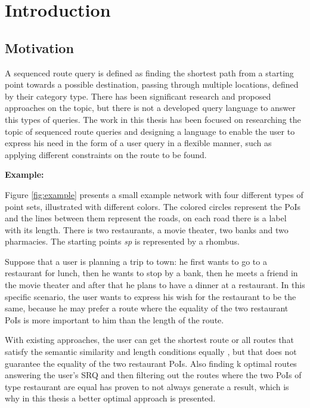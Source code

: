 \chapter{Introduction}
\label{sec:intro}

\section{Motivation}
\label{sec:motivation}
A sequenced route query is defined as finding the shortest path from a starting point towards a possible destination, passing through multiple locations, defined by their category type. There has been significant research and proposed approaches on the topic, but there is not a developed query language to answer this types of queries. The work in this thesis has been focused on researching the topic of sequenced route queries and designing a language to enable the user to express his need in the form of a user query in a flexible manner, such as applying different constraints on the route to be found.

\textbf{Example:}

Figure \ref{fig:example} presents a small example network with four different types of point sets, illustrated with different colors. The colored circles represent the PoIs and the lines between them represent the roads, on each road there is a label with its length. There is two restaurants, a movie theater, two banks and two pharmacies. The starting points \textit{sp} is represented by a rhombus.

Suppose that a user is planning a trip to town: he first wants to go to a restaurant for lunch, then he wants to stop by a bank, then he meets a friend in the movie theater and after that he plans to have a dinner at a restaurant. In this specific scenario, the user wants to express his wish for the restaurant to be the same, because he may prefer a route where the equality of the two restaurant PoIs is more important to him than the length of the route.

With existing approaches, the user can get the shortest route \cite{OSR} or all routes that satisfy the semantic similarity and length conditions equally \cite{semanticSRQ}, but that does not guarantee the equality of the two restaurant PoIs. Also finding k optimal routes answering the user's SRQ and then filtering out the routes where the two PoIs of type restaurant are equal has proven to not always generate a result, which is why in this thesis a better optimal approach is presented.

